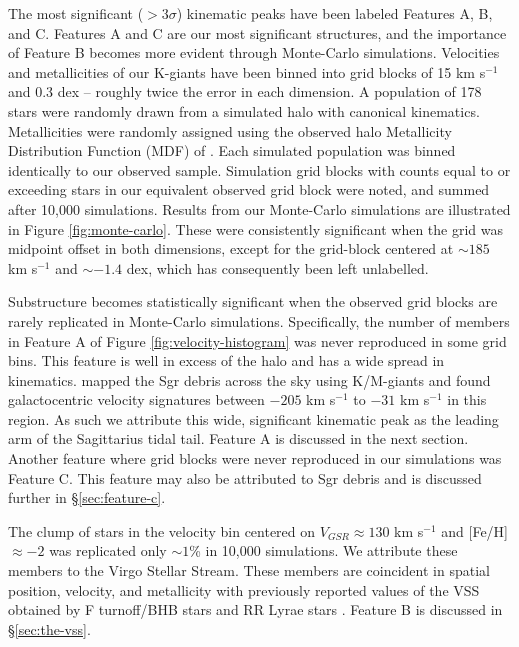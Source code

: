 \documentclass[preprint2]{aastex}
\begin{document}
	The most significant ($>3\sigma$) kinematic peaks have been labeled Features A, B, and C. Features A and C are our most significant structures, and the importance of Feature B becomes more evident through Monte-Carlo simulations. Velocities and metallicities of our K-giants have been binned into grid blocks of 15 km s$^{-1}$ and 0.3 dex \--- roughly twice the error in each dimension. A population of 178 stars were randomly drawn from a simulated halo with canonical kinematics. Metallicities were randomly assigned using the observed halo Metallicity Distribution Function (MDF) of \citet{Ryan;Norris_1991}. Each simulated population was binned identically to our observed sample. Simulation grid blocks with counts equal to or exceeding stars in our equivalent observed grid block were noted, and summed after 10,000 simulations. Results from our Monte-Carlo simulations are illustrated in Figure \ref{fig:monte-carlo}. These were consistently significant when the grid was midpoint offset in both dimensions, except for the grid-block centered at $\sim185$ km s$^{-1}$ and $\sim-1.4$ dex, which has consequently been left unlabelled.
	
	 Substructure becomes statistically significant when the observed grid blocks are rarely replicated in Monte-Carlo simulations. Specifically, the number of members in Feature A of Figure \ref{fig:velocity-histogram} was never reproduced in some grid bins. This feature is well in excess of the halo and has a wide spread in kinematics. \citet{Chou;et-al_2007} mapped the Sgr debris across the sky using K/M-giants and found galactocentric velocity signatures between $-205$ km s$^{-1}$ to $-31$ km s$^{-1}$ in this region. As such we attribute this wide, significant kinematic peak as the leading arm of the Sagittarius tidal tail. Feature A is discussed in the next section. Another feature where grid blocks were never reproduced in our simulations was Feature C. This feature may also be attributed to Sgr debris and is discussed further in \S\ref{sec:feature-c}.
	 	
	 The clump of stars in the velocity bin centered on $V_{GSR} \approx 130$ km s$^{-1}$ and [Fe/H] $\approx -2$ was replicated only $\sim1$\% in 10,000 simulations. We attribute these members to the Virgo Stellar Stream. These members are coincident in spatial position, velocity, and metallicity with previously reported values of the VSS obtained by F turnoff/BHB stars \citep{Newberg;et-al_2007} and RR Lyrae stars \citep{Prior;et-al_2009a}. Feature B is discussed in \S\ref{sec:the-vss}.
\end{document}
